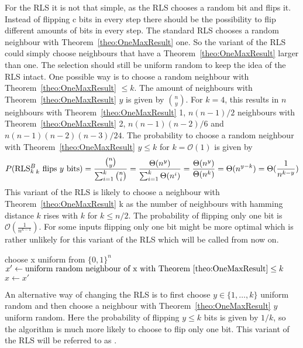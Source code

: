 For the RLS it is not that simple, as the RLS chooses a random bit and flips it.
Instead of flipping c bits in every step there should be the possibility to flip different amounts of bits in every step.
The standard RLS chooses a random neighbour with Theorem~\ref{theo:OneMaxResult} one.
So the variant of the RLS could simply choose neighbours that have a Theorem~\ref{theo:OneMaxResult} larger than one.
The selection should still be uniform random to keep the idea of the RLS intact.
One possible way is to choose a random neighbour with Theorem~\ref{theo:OneMaxResult} $\le k$.
The amount of neighbours with Theorem~\ref{theo:OneMaxResult} $y$ is given by $\binom{n}{y}$.
For $k=4$, this results in $n$ neighbours with Theorem~\ref{theo:OneMaxResult} 1, $n(n-1)/2$ neighbours with Theorem~\ref{theo:OneMaxResult} 2, $n(n-1)(n-2)/6$
and $n(n-1)(n-2)(n-3)/24$.
The probability to choose a random neighbour with Theorem~\ref{theo:OneMaxResult} $y \le k$ for $k = \mathcal{O}(1)$ is given by
\[P(\text{RLS$^{B}_{k}$}_k\text{ flips }y\text{ bits}) = \frac{\binom{n}{y}}{\sum_{i=1}^k \binom{n}{i}} = \frac{\Theta(n^y)}{\sum_{i=1}^k \Theta(n^i)}
      = \frac{\Theta(n^y)}{\Theta(n^k)} = \Theta(n^{y-k}) = \Theta(\frac{1}{n^{k-y}})\]
This variant of the RLS is likely to choose a neighbour with Theorem~\ref{theo:OneMaxResult} k as the number of neighbours with hamming
distance $k$ rises with $k$ for $k \le n/2$.
The probability of flipping only one bit is $\mathcal{O}(\frac{1}{n^{k-1}})$.
For some inputs flipping only one bit might be more optimal which is rather unlikely for this variant of the RLS which will be called \RLSN from now on.
\begin{algorithm}[bt]
      \caption{\textsc{\RLSN}}\label{alg:rlsN}

      \DontPrintSemicolon %

      \BlankLine
      choose x uniform from ${\{0,1\}}^n$\;
      {
      $x' \leftarrow \text{uniform random neighbour of x with Theorem~\ref{theo:OneMaxResult}} \le k$\;
      {
      {
            $x \leftarrow x'$\;
      }
      }
      }
\end{algorithm}

An alternative way of changing the RLS is to first choose $y \in \{1, \dots, k\}$ uniform random and then choose a neighbour with Theorem~\ref{theo:OneMaxResult} $y$ uniform random.
Here the probability of flipping $y \le k$ bits is given by $1/k$, so the algorithm is much more likely to choose to flip only one bit.
This variant of the RLS will be referred to as \RLSR.

